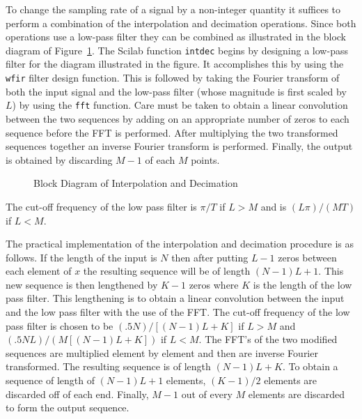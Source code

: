 	To change the sampling rate of a signal by a non-integer
quantity it suffices to perform a combination of the interpolation
and decimation operations.  Since both operations use a low-pass filter they
can be combined as illustrated in the block diagram of Figure~\ref{f44.1}.
The Scilab function {\tt intdec} begins by designing a low-pass filter for the 
diagram illustrated in the figure.  It accomplishes this by using
the {\tt wfir} filter design function.  This is followed by taking the
Fourier transform of both the input signal and the low-pass filter
(whose magnitude is first scaled by $L$)
by using the {\tt fft} function.  Care must be taken to obtain a linear
convolution between the two sequences by adding on an appropriate number
of zeros to each sequence before the FFT is performed.  After multiplying
the two transformed sequences together an inverse Fourier transform
is performed.  Finally, the output is obtained by discarding $M-1$
of each $M$ points.
%
\begin{figure}[tb]
\caption{ Block Diagram of Interpolation and Decimation}
\label{f44.1}
\end{figure}
%
The cut-off frequency of the low pass filter is $\pi/T$
if $L>M$ and is $(L\pi)/(MT)$ if $L<M$.

	The practical implementation of the interpolation and decimation
procedure is as follows.
If the length of the input is $N$ then after putting $L-1$ zeros
between each element of $x$ the resulting sequence will be of length
$(N-1)L+1$.  This new sequence is then lengthened by $K-1$ zeros
where $K$ is the length of the low pass filter.  This lengthening is
to obtain a linear convolution between the input and the low pass
filter with the use of the FFT.  The cut-off frequency
of the low pass filter is chosen to be $(.5N)/[(N-1)L+K]$ if $L>M$
and $(.5NL)/(M[(N-1)L+K])$ if $L<M$.  
The FFT's of the two modified sequences are multiplied
element by element and then are inverse Fourier transformed.
The resulting sequence is of length $(N-1)L+K$.  To obtain a
sequence of length of $(N-1)L+1$ elements, $(K-1)/2$ elements
are discarded off of each end.  Finally, $M-1$ out of every
$M$ elements are discarded to form the output sequence.

